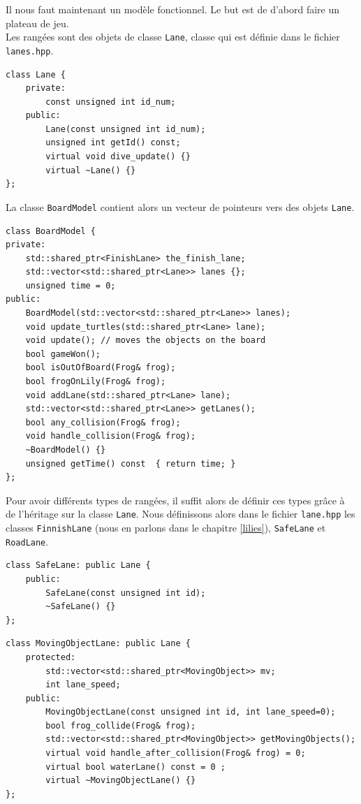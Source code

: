 \documentclass[a4paper, 12pt]{article}
\begin{document}
Il nous faut maintenant un modèle fonctionnel. Le but est de d'abord faire un plateau de jeu. \\

Les rangées sont des objets de classe \texttt{Lane}, classe qui est définie dans le fichier \texttt{lanes.hpp}.

\begin{lstlisting}
class Lane {
    private:
        const unsigned int id_num;
    public:
        Lane(const unsigned int id_num);
        unsigned int getId() const;
        virtual void dive_update() {}
        virtual ~Lane() {}
};  
\end{lstlisting}

La classe \texttt{BoardModel} contient alors un vecteur de pointeurs vers des objets \texttt{Lane}.

\begin{lstlisting}
class BoardModel {
private:
    std::shared_ptr<FinishLane> the_finish_lane;
    std::vector<std::shared_ptr<Lane>> lanes {};
    unsigned time = 0;
public:
    BoardModel(std::vector<std::shared_ptr<Lane>> lanes);
    void update_turtles(std::shared_ptr<Lane> lane);
    void update(); // moves the objects on the board
    bool gameWon();
    bool isOutOfBoard(Frog& frog);
    bool frogOnLily(Frog& frog);
    void addLane(std::shared_ptr<Lane> lane);
    std::vector<std::shared_ptr<Lane>> getLanes();
    bool any_collision(Frog& frog);
    void handle_collision(Frog& frog);
    ~BoardModel() {}
    unsigned getTime() const  { return time; }
};
\end{lstlisting}

Pour avoir différents types de rangées, il suffit alors de définir ces types grâce à de l'héritage sur la classe \texttt{Lane}. Nous définissons alors dans le fichier \texttt{lane.hpp} les classes \texttt{FinnishLane} (nous en parlons dans le chapitre \ref{lilies}), \texttt{SafeLane} et \texttt{RoadLane}. \\

\begin{lstlisting}
class SafeLane: public Lane {
    public:
        SafeLane(const unsigned int id);
        ~SafeLane() {}
};
\end{lstlisting}

\begin{lstlisting}
class MovingObjectLane: public Lane {
    protected:
        std::vector<std::shared_ptr<MovingObject>> mv;
        int lane_speed;
    public:
        MovingObjectLane(const unsigned int id, int lane_speed=0);
        bool frog_collide(Frog& frog);
        std::vector<std::shared_ptr<MovingObject>> getMovingObjects();
        virtual void handle_after_collision(Frog& frog) = 0;
        virtual bool waterLane() const = 0 ;
        virtual ~MovingObjectLane() {}
};
\end{lstlisting}
\end{document}
